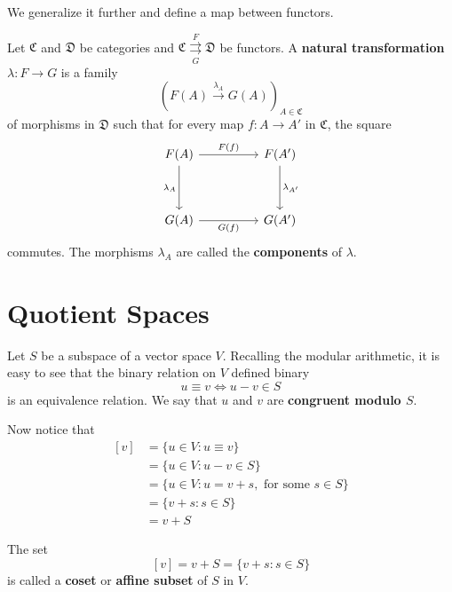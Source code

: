 We generalize it further and define a map between functors.

\begin{definition}
	Let $\mathfrak{C}$ and $\mathfrak{D}$ be categories and $\mathfrak{C} \overset{F}{\underset{G}{\rightrightarrows}} \mathfrak{D}$ be functors. A \textbf{natural transformation} $\lambda : F \longrightarrow G$ is a family \[ \left( F(A) \overset{\lambda_A}{\longrightarrow} G(A) \right)_{A \in \mathfrak{C}} \] of morphisms in $\mathfrak{D}$ such that for every map $f : A \longrightarrow A'$ in $\mathfrak{C}$, the square 
	\[\begin{tikzcd}
		{F(A)} && {F(A')} \\
		\\
		{G(A)} && {G(A')}
		\arrow["{\lambda_A}"', from=1-1, to=3-1]
		\arrow["{G(f)}"', from=3-1, to=3-3]
		\arrow["{\lambda_{A'}}", from=1-3, to=3-3]
		\arrow["{F(f)}", from=1-1, to=1-3]
	\end{tikzcd}\]
	commutes. The morphisms $\lambda_A$ are called the \textbf{components} of $\lambda$.
\end{definition}

\section{Quotient Spaces}

Let $S$ be a subspace of a vector space $V$. Recalling the modular arithmetic, it is easy to see that the binary relation on $V$ defined binary
\[
	u \equiv v \iff u-v \in S
\]
is an equivalence relation. We say that $u$ and $v$ are \textbf{congruent modulo $S$}.

Now notice that
\begin{equation*}
	\begin{aligned}
		[v] &= \{ u \in V : u \equiv v \} \\
			&= \{ u \in V : u-v \in S \} \\
			&= \{ u \in V : u = v+s, \text{ for some } s \in S \} \\
			&= \{ v + s : s \in S \} \\
			&= v + S
	\end{aligned}
\end{equation*}

The set
\[
	[v] = v + S = \{ v+s : s \in S \}
\]
is called a \textbf{coset} or \textbf{affine subset} of $S$ in $V$.

